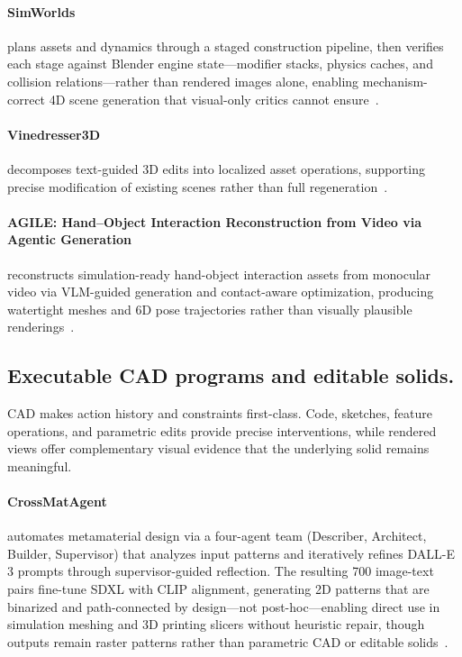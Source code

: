 \paragraph{SimWorlds} plans assets and dynamics through a staged construction pipeline, then verifies each stage against Blender engine state—modifier stacks, physics caches, and collision relations—rather than rendered images alone, enabling mechanism-correct 4D scene generation that visual-only critics cannot ensure~\cite{avg260701766}.

\paragraph{Vinedresser3D} decomposes text-guided 3D edits into localized asset operations, supporting precise modification of existing scenes rather than full regeneration~\cite{avg260219542}.

\paragraph{AGILE: Hand--Object Interaction Reconstruction from Video via Agentic Generation} reconstructs simulation-ready hand-object interaction assets from monocular video via VLM-guided generation and contact-aware optimization, producing watertight meshes and 6D pose trajectories rather than visually plausible renderings~\cite{avg260204672}.

\subsection{Executable CAD programs and editable solids.}
CAD makes action history and constraints first-class. Code, sketches, feature operations, and parametric edits provide precise interventions, while rendered views offer complementary visual evidence that the underlying solid remains meaningful.

\paragraph{CrossMatAgent} automates metamaterial design via a four-agent team (Describer, Architect, Builder, Supervisor) that analyzes input patterns and iteratively refines DALL-E 3 prompts through supervisor-guided reflection. The resulting 700 image-text pairs fine-tune SDXL with CLIP alignment, generating 2D patterns that are binarized and path-connected by design—not post-hoc—enabling direct use in simulation meshing and 3D printing slicers without heuristic repair, though outputs remain raster patterns rather than parametric CAD or editable solids~\cite{avg250319889}.

